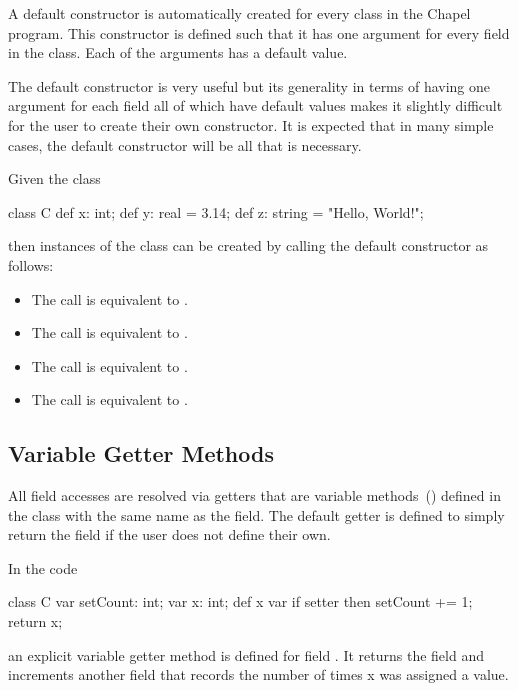 A default constructor is automatically created for every class in the
Chapel program.  This constructor is defined such that it has one
argument for every field in the class.  Each of the arguments has a
default value.

The default constructor is very useful but its generality in terms of
having one argument for each field all of which have default values
makes it slightly difficult for the user to create their own
constructor.  It is expected that in many simple cases, the default
constructor will be all that is necessary.

\begin{example}
Given the class
\begin{chapel}
class C {
  def x: int;
  def y: real = 3.14;
  def z: string = "Hello, World!";
}
\end{chapel}
then instances of the class can be created by calling the default
constructor as follows:
\begin{itemize}
\item The call  is equivalent to .
\item The call  is equivalent to .
\item The call  is equivalent to .
\item The call  is equivalent to .
\end{itemize}
\end{example}

\subsection{Variable Getter Methods}
\label{Getter_Methods}

All field accesses are resolved via getters that are variable
methods~() defined in the class with the same
name as the field.  The default getter is defined to simply return the
field if the user does not define their own.

\begin{example}
In the code
\begin{chapel}
class C {
  var setCount: int;
  var x: int;
  def x var {
    if setter then
      setCount += 1;
    return x;
  }
}
\end{chapel}
an explicit variable getter method is defined for field .  It
returns the field  and increments another field that records
the number of times x was assigned a value.
\end{example}

